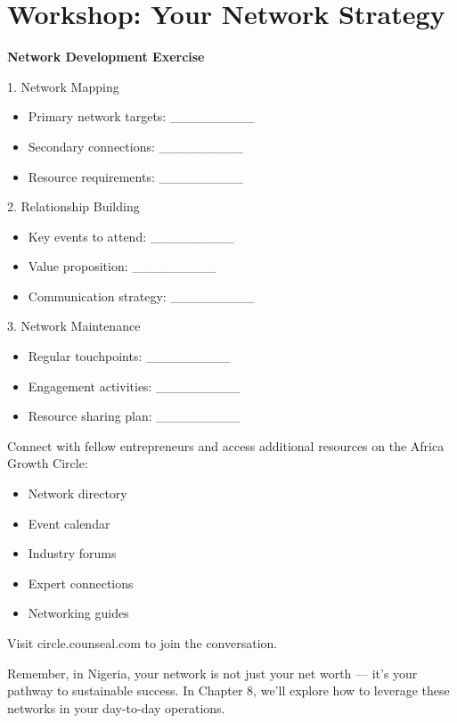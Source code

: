 \section{Workshop: Your Network Strategy}\label{sec:network-strategy-workshop}

\begin{workshopbox}
\textbf{Network Development Exercise}

1. Network Mapping
\begin{itemize}
    \item Primary network targets: \_\_\_\_\_\_\_\_\_
    \item Secondary connections: \_\_\_\_\_\_\_\_\_
    \item Resource requirements: \_\_\_\_\_\_\_\_\_
\end{itemize}

2. Relationship Building
\begin{itemize}
    \item Key events to attend: \_\_\_\_\_\_\_\_\_
    \item Value proposition: \_\_\_\_\_\_\_\_\_
    \item Communication strategy: \_\_\_\_\_\_\_\_\_
\end{itemize}

3. Network Maintenance
\begin{itemize}
    \item Regular touchpoints: \_\_\_\_\_\_\_\_\_
    \item Engagement activities: \_\_\_\_\_\_\_\_\_
    \item Resource sharing plan: \_\_\_\_\_\_\_\_\_
\end{itemize}
\end{workshopbox}

\begin{communitybox}
Connect with fellow entrepreneurs and access additional resources on the Africa Growth Circle:
\begin{itemize}
    \item Network directory
    \item Event calendar
    \item Industry forums
    \item Expert connections
    \item Networking guides
\end{itemize}
Visit circle.counseal.com to join the conversation.
\end{communitybox}

\begin{importantbox}
Remember, in Nigeria, your network is not just your net worth --- it's your pathway to sustainable success. In Chapter 8, we'll explore how to leverage these networks in your day-to-day operations.
\end{importantbox}
